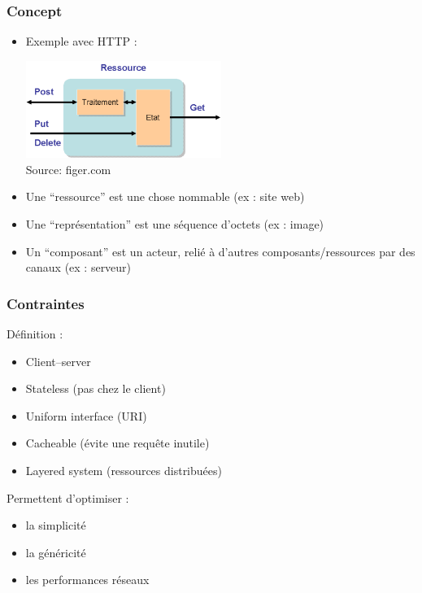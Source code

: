 \documentclass{beamer}
\begin{document}
        \begin{frame}
            \frametitle{Concept}
            \begin{itemize}
                \item Exemple avec HTTP : 
                \begin{center}
                    \includegraphics[width=0.5\textwidth]{get-post} \\
                    \tiny Source: figer.com 
                \end{center}
                \item Une ``ressource'' est une chose nommable (ex : site web)
                \item Une ``représentation'' est une séquence d’octets (ex : image)
                \item Un ``composant'' est un acteur, relié à d’autres composants/ressources par des canaux (ex : serveur)
            \end{itemize}
        \end{frame}

        \begin{frame}
            \frametitle{Contraintes}
            Définition :
            \begin{itemize}
                \item Client–server 
                \item Stateless (pas chez le client)
                \item Uniform interface (URI)
                \item Cacheable (évite une requête inutile)
                \item Layered system (ressources distribuées)
            \end{itemize}
            \pause
            Permettent d'optimiser :
            \begin{itemize}
                \item la simplicité
                \item la généricité
                \item les performances réseaux 
            \end{itemize}
        \end{frame}
\end{document}
